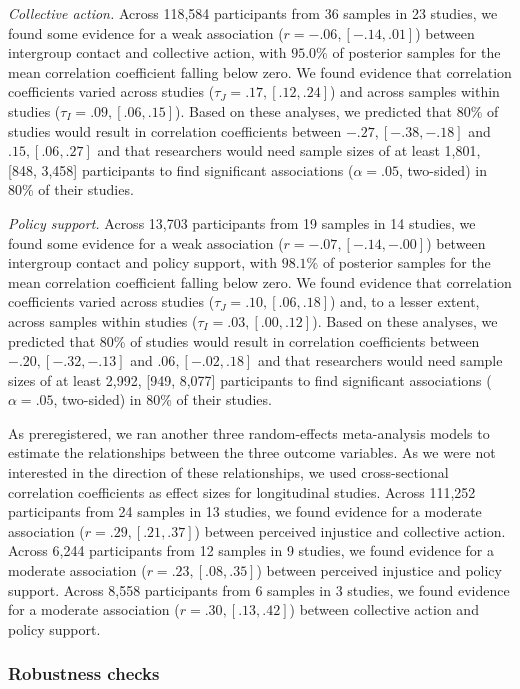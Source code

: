 \documentclass[
]{article}
\begin{document}
\emph{Collective action.} Across 118,584 participants from 36 samples in
23 studies, we found some evidence for a weak association
(\(r = -.06, [-.14, .01]\)) between intergroup contact and collective
action, with \(95.0\%\) of posterior samples for the mean correlation
coefficient falling below zero. We found evidence that correlation
coefficients varied across studies (\(\tau_J = .17, [.12, .24]\)) and
across samples within studies (\(\tau_I = .09, [.06, .15]\)). Based on
these analyses, we predicted that 80\% of studies would result in
correlation coefficients between \(-.27, [-.38, -.18]\) and
\(.15, [.06, .27]\) and that researchers would need sample sizes of at
least 1,801, {[}848, 3,458{]} participants to find significant
associations (\(\alpha = .05\), two-sided) in 80\% of their studies.

\emph{Policy support.} Across 13,703 participants from 19 samples in 14
studies, we found some evidence for a weak association
(\(r = -.07, [-.14, -.00]\)) between intergroup contact and policy
support, with \(98.1\%\) of posterior samples for the mean correlation
coefficient falling below zero. We found evidence that correlation
coefficients varied across studies (\(\tau_J = .10, [.06, .18]\)) and,
to a lesser extent, across samples within studies
(\(\tau_I = .03, [.00, .12]\)). Based on these analyses, we predicted
that 80\% of studies would result in correlation coefficients between
\(-.20, [-.32, -.13]\) and \(.06, [-.02, .18]\) and that researchers
would need sample sizes of at least 2,992, {[}949, 8,077{]} participants
to find significant associations (\(\alpha = .05\), two-sided) in 80\%
of their studies.

As preregistered, we ran another three random-effects meta-analysis
models to estimate the relationships between the three outcome
variables. As we were not interested in the direction of these
relationships, we used cross-sectional correlation coefficients as
effect sizes for longitudinal studies. Across 111,252 participants from
24 samples in 13 studies, we found evidence for a moderate association
(\(r = .29, [.21, .37]\)) between perceived injustice and collective
action. Across 6,244 participants from 12 samples in 9 studies, we found
evidence for a moderate association (\(r = .23, [.08, .35]\)) between
perceived injustice and policy support. Across 8,558 participants from 6
samples in 3 studies, we found evidence for a moderate association
(\(r = .30, [.13, .42]\)) between collective action and policy support.

\hypertarget{robustness-checks}{%
\subsubsection{Robustness checks}\label{robustness-checks}}
\end{document}

